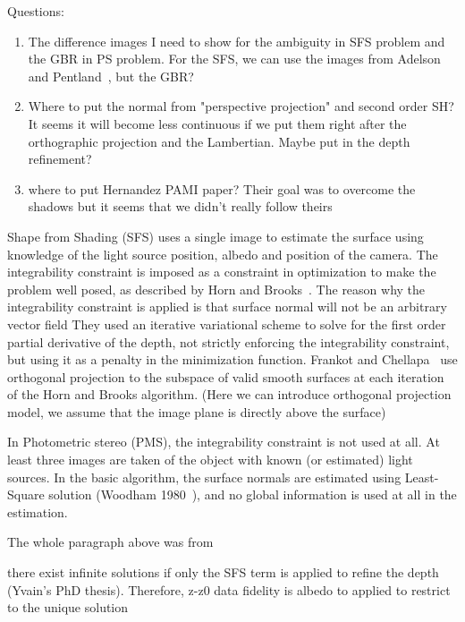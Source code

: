 {\color{red} Questions:}
\begin{enumerate}
\item The difference images I need to show for the ambiguity in SFS problem and the GBR in PS problem. For the SFS, we can use the images from Adelson and Pentland~\cite{adelson1996perception}, but the GBR?
\item Where to put the normal from "perspective projection" and second order SH? It seems it will become less continuous if we put them right after the orthographic projection and the Lambertian. Maybe put in the depth refinement? 
\item where to put Hernandez PAMI paper? Their goal was to overcome the shadows but it seems that we didn't really follow theirs
\end{enumerate}

Shape from Shading (SFS) uses a single image to estimate the surface using knowledge of the light source position, albedo and position of the camera. The integrability constraint is imposed as a constraint in optimization to make the problem well posed, as described by Horn and Brooks~\cite{horn1986variational}.
The reason why the integrability constraint is applied is that surface normal will not be an arbitrary vector field
They used an iterative variational scheme to solve for the first order partial derivative of the depth, not strictly enforcing the integrability constraint, but using it as a penalty in the minimization function.
 Frankot and Chellapa~\cite{frankot1988method} use orthogonal projection to the subspace of valid smooth surfaces at each iteration of the Horn and Brooks algorithm. (Here we can introduce orthogonal projection model, we assume that the image plane is directly above the surface)
 
In Photometric stereo (PMS), the integrability constraint is not used at all. At least three images are taken of the object with known (or estimated) light sources.  In the basic algorithm, the surface normals are estimated using Least-Square solution (Woodham 1980~\cite{woodham1980photometric}), and no global information is used at all in the estimation. 

The whole paragraph above was from~\cite{petrovic2001enforcing}






there exist infinite solutions if only the SFS term is applied to refine the depth (Yvain's PhD thesis). Therefore, z-z0 data fidelity is albedo to applied to restrict to the unique solution 
